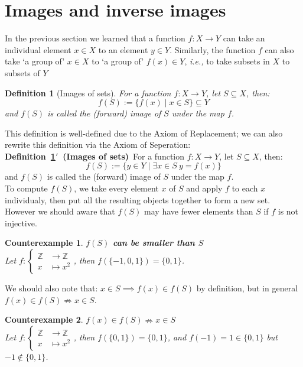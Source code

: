 \documentclass[a4paper]{book}
\theoremstyle{break}
\newtheorem{counterexample}{\hspace{-30pt}\protect\dbend\hspace{15pt}Counterexample}[section]
\newtheorem{definition}{Definition}[section]
\begin{document}
		\section{Images and inverse images}
			In the previous section we learned that a function $f:X\to Y$ can take an individual element $x\in X$ to an element $y\in Y$. Similarly, the function $f$ can also take `a group of' $x\in X$ to `a group of' $f(x)\in Y$, \textit{i.e.,} to take subsets in $X$ to subsets of $Y$
			\begin{definition}[Images of sets]
				\label{def:images of set}
				For a function $f:X\to Y$, let $S\subseteq X$, then:
				$$f(S):=\{f(x)\mid x\in S\}\subseteq Y$$
				and $f(S)$ is called the (forward) image of $S$ under the map $f$.
			\end{definition}
			This definition is well-defined due to the Axiom of Replacement; we can also rewrite this definition via the Axiom of Seperation:\\
			\textbf{Definition~\ref{def:images of set}$'$~(Images of sets)}~For a function $f:X\to Y$, let $S\subseteq X$, then:
			$$f(S):=\{y\in Y\mid \exists x\in S~y=f(x)\}$$
			and $f(S)$ is called the (forward) image of $S$ under the map $f$.\\
			To compute $f(S)$, we take every element $x$ of $S$ and apply $f$ to each $x$ individualy, then put all the resulting objects together to form a new set.\\
			However we should aware that $f(S)$ may have fewer elements than $S$ if $f$ is not injective.
			\begin{counterexample}
				\textbf{$f(S)$ can be smaller than $S$}\\
				Let $f:\left\{\begin{aligned}\mathbb{Z}&\to\mathbb{Z}\\x&\mapsto x^2\end{aligned}\right.$, then $f(\{-1,0,1\})=\{0,1\}$.
			\end{counterexample}
			We should also note that: $x\in S\implies f(x)\in f(S)$ by definition, but in general $f(x)\in f(S)\nRightarrow x\in S$.
			\begin{counterexample}
				{\boldmath$f(x)\in f(S)\nRightarrow x\in S$}\\
				Let $f:\left\{\begin{aligned}\mathbb{Z}&\to\mathbb{Z}\\x&\mapsto x^2\end{aligned}\right.$, then $f(\{0,1\})=\{0,1\}$, and $f(-1)=1\in\{0,1\}$ but $-1\notin\{0,1\}$.
			\end{counterexample}
\end{document}
